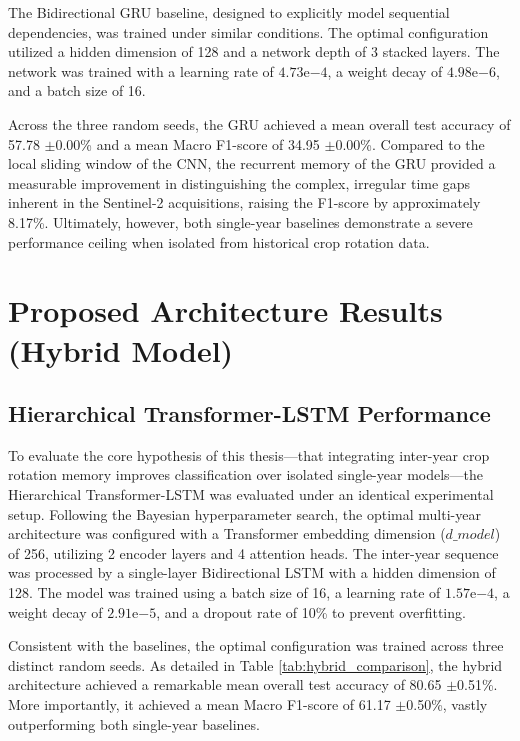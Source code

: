 The Bidirectional GRU baseline, designed to explicitly model sequential dependencies, was trained under similar conditions.
The optimal configuration utilized a hidden dimension of 128 and a network depth of 3 stacked layers.
The network was trained with a learning rate of $4.73\mathrm{e}{-4}$, a weight decay of $4.98\mathrm{e}{-6}$, and a batch size of 16.

Across the three random seeds, the GRU achieved a mean overall test accuracy of 57.78 $\pm$0.00\% and a mean Macro F1-score of 34.95 $\pm$0.00\%.
Compared to the local sliding window of the CNN, the recurrent memory of the GRU provided a measurable improvement in distinguishing the complex,
irregular time gaps inherent in the Sentinel-2 acquisitions, raising the F1-score by approximately 8.17\%.
Ultimately, however, both single-year baselines demonstrate a severe performance ceiling when isolated from historical crop rotation data.


\section{Proposed Architecture Results (Hybrid Model)}
\label{sec:hybrid_results}

\subsection{Hierarchical Transformer-LSTM Performance}
\label{subsec:transformer_lstm_performance}

To evaluate the core hypothesis of this thesis---that integrating inter-year crop rotation memory improves classification over
isolated single-year models---the Hierarchical Transformer-LSTM was evaluated under an identical experimental setup. 
Following the Bayesian hyperparameter search, the optimal multi-year architecture was configured with a
Transformer embedding dimension ($d\_model$) of 256, utilizing 2 encoder layers and 4 attention heads.
The inter-year sequence was processed by a single-layer Bidirectional LSTM with a hidden dimension of 128.
The model was trained using a batch size of 16, a learning rate of $1.57\mathrm{e}{-4}$, a weight decay of $2.91\mathrm{e}{-5}$, and a dropout rate of 10\% to prevent overfitting.

Consistent with the baselines, the optimal configuration was trained across three distinct random seeds.
As detailed in Table \ref{tab:hybrid_comparison}, the hybrid architecture achieved a remarkable mean overall test accuracy of 80.65 $\pm$0.51\%.
More importantly, it achieved a mean Macro F1-score of 61.17 $\pm$0.50\%, vastly outperforming both single-year baselines. 

